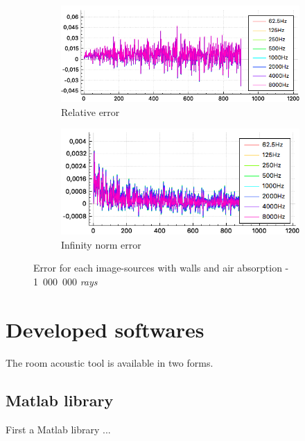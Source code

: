 \documentclass[AMA,STIX1COL]{WileyNJD-v2}
\begin{document}
\begin{figure}[h]
\centering
	\begin{subfigure}{0.49\textwidth}
		\includegraphics[width=\linewidth]{test3_8}
		\caption{Relative error}
		\label{test3_8}
	\end{subfigure}
	\begin{subfigure}{0.49\textwidth}
		\includegraphics[width=\linewidth]{test3_9}
		\caption{Infinity norm error}
		\label{test3_9}
	\end{subfigure}
	\caption{Error for each image-sources with walls and air absorption - 1~000~000 \textit{rays}}
\end{figure}


\newpage

\section{Developed softwares }\label{sec6}

The room acoustic tool is available in two forms. 

\subsection{Matlab library}
First a Matlab library \cite{gypsilab} ... \\
\end{document}
